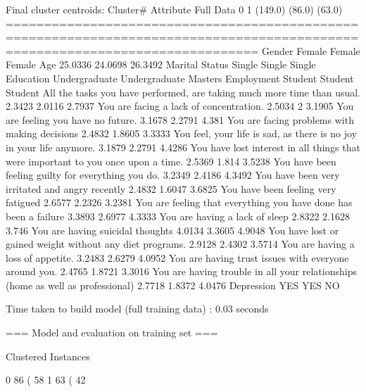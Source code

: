 Final cluster centroids:
                                                                                                       Cluster#
Attribute                                                                               Full Data             0             1
                                                                                          (149.0)        (86.0)        (63.0)
=============================================================================================================================
Gender                                                                                     Female        Female        Female
Age                                                                                       25.0336       24.0698       26.3492
Marital Status                                                                             Single        Single        Single
Education                                                                           Undergraduate Undergraduate       Masters
Employment                                                                                Student       Student       Student
All the tasks you have performed, are taking much more time than usual.                    2.3423        2.0116        2.7937
You are facing a lack of concentration.                                                    2.5034             2        3.1905
You are feeling you have no future.                                                        3.1678        2.2791         4.381
You are facing problems with making decisions                                              2.4832        1.8605        3.3333
You feel, your life is sad, as there is no joy in your life anymore.                       3.1879        2.2791        4.4286
You have lost interest in all things that were important to you once upon a time.          2.5369         1.814        3.5238
You have been feeling guilty for everything you do.                                        3.2349        2.4186        4.3492
You have been very irritated and angry recently                                            2.4832        1.6047        3.6825
You have been feeling very fatigued                                                        2.6577        2.2326        3.2381
You are feeling that everything you have done has been a failure                           3.3893        2.6977        4.3333
You are having a lack of sleep                                                             2.8322        2.1628         3.746
You are having suicidal thoughts                                                           4.0134        3.3605        4.9048
You have lost or gained weight without any diet programs.                                  2.9128        2.4302        3.5714
You are having a loss of appetite.                                                         3.2483        2.6279        4.0952
You are having trust issues with everyone around you.                                      2.4765        1.8721        3.3016
You are having trouble in all your relationships (home as well as professional)            2.7718        1.8372        4.0476
Depression                                                                                    YES           YES            NO




Time taken to build model (full training data) : 0.03 seconds

=== Model and evaluation on training set ===

Clustered Instances

0       86 ( 58%
1       63 ( 42%

